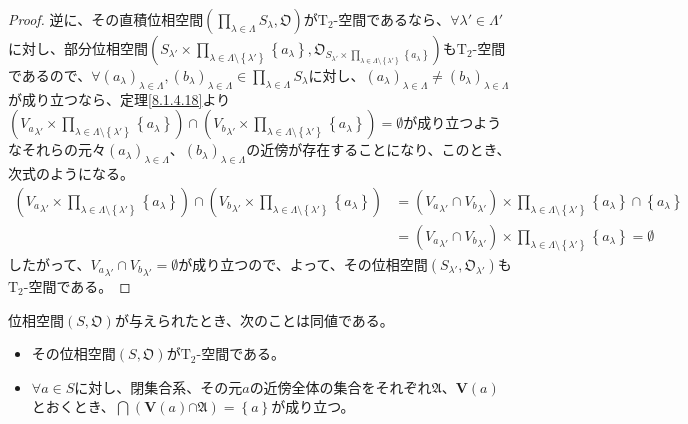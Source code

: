 \documentclass[dvipdfmx]{jsarticle}
\begin{document}
\begin{proof}
逆に、その直積位相空間$\left( \prod_{\lambda \in \varLambda} S_{\lambda},\mathfrak{O} \right)$が$\mathrm{T}_{2}$-空間であるなら、$\forall\lambda' \in \varLambda'$に対し、部分位相空間$\left( S_{\lambda'} \times \prod_{\lambda \in \varLambda \setminus \left\{ \lambda' \right\}} \left\{ a_{\lambda} \right\},\mathfrak{O}_{S_{\lambda'} \times \prod_{\lambda \in \varLambda \setminus \left\{ \lambda' \right\}} \left\{ a_{\lambda} \right\}} \right)$も$\mathrm{T}_{2}$-空間であるので、$\forall\left( a_{\lambda} \right)_{\lambda \in \varLambda},\left( b_{\lambda} \right)_{\lambda \in \varLambda} \in \prod_{\lambda \in \varLambda} S_{\lambda}$に対し、$\left( a_{\lambda} \right)_{\lambda \in \varLambda} \neq \left( b_{\lambda} \right)_{\lambda \in \varLambda}$が成り立つなら、定理\ref{8.1.4.18}より$\left( {V_{a}}_{\lambda'} \times \prod_{\lambda \in \varLambda \setminus \left\{ \lambda' \right\}} \left\{ a_{\lambda} \right\} \right) \cap \left( {V_{b}}_{\lambda'} \times \prod_{\lambda \in \varLambda \setminus \left\{ \lambda' \right\}} \left\{ a_{\lambda} \right\} \right) = \emptyset$が成り立つようなそれらの元々$\left( a_{\lambda} \right)_{\lambda \in \varLambda}$、$\left( b_{\lambda} \right)_{\lambda \in \varLambda}$の近傍が存在することになり、このとき、次式のようになる。
\begin{align*}
\left( {V_{a}}_{\lambda'} \times \prod_{\lambda \in \varLambda \setminus \left\{ \lambda' \right\}} \left\{ a_{\lambda} \right\} \right) \cap \left( {V_{b}}_{\lambda'} \times \prod_{\lambda \in \varLambda \setminus \left\{ \lambda' \right\}} \left\{ a_{\lambda} \right\} \right) &= \left( {V_{a}}_{\lambda'} \cap {V_{b}}_{\lambda'} \right) \times \prod_{\lambda \in \varLambda \setminus \left\{ \lambda' \right\}} {\left\{ a_{\lambda} \right\} \cap \left\{ a_{\lambda} \right\}}\\
&= \left( {V_{a}}_{\lambda'} \cap {V_{b}}_{\lambda'} \right) \times \prod_{\lambda \in \varLambda \setminus \left\{ \lambda' \right\}} \left\{ a_{\lambda} \right\} = \emptyset
\end{align*}
したがって、${V_{a}}_{\lambda'} \cap {V_{b}}_{\lambda'} = \emptyset$が成り立つので、よって、その位相空間$\left( S_{\lambda'},\mathfrak{O}_{\lambda'} \right)$も$\mathrm{T}_{2}$-空間である。
\end{proof}
\begin{thm}\label{8.1.7.9}
位相空間$\left( S,\mathfrak{O} \right)$が与えられたとき、次のことは同値である。
\begin{itemize}
\item
  その位相空間$\left( S,\mathfrak{O} \right)$が$\mathrm{T}_{2}$-空間である。
\item
  $\forall a \in S$に対し、閉集合系、その元$a$の近傍全体の集合をそれぞれ$\mathfrak{A}$、$\mathbf{V}(a)$とおくとき、$\bigcap_{} \left( \mathbf{V}(a)\mathfrak{\cap A} \right) = \left\{ a \right\}$が成り立つ。
\end{itemize}
\end{thm}
\end{document}
